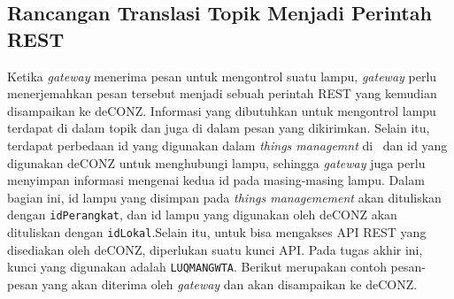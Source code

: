 \subsection{Rancangan Translasi Topik Menjadi Perintah REST}
Ketika \textit{gateway} menerima pesan untuk mengontrol suatu lampu, \textit{gateway} perlu menerjemahkan pesan tersebut menjadi sebuah perintah REST yang kemudian disampaikan ke deCONZ. Informasi yang dibutuhkan untuk mengontrol lampu terdapat di dalam topik dan juga di dalam pesan yang dikirimkan. Selain itu, terdapat perbedaan id yang digunakan dalam \textit{things managemnt} di \plat~dan id yang digunakan deCONZ untuk menghubungi lampu, sehingga \textit{gateway} juga perlu menyimpan informasi mengenai kedua id pada masing-masing lampu. Dalam bagian ini, id lampu yang disimpan pada \textit{things managemement} akan dituliskan dengan \texttt{idPerangkat}, dan id lampu yang digunakan oleh deCONZ akan dituliskan dengan \texttt{idLokal}.Selain itu, untuk bisa mengakses API REST yang disediakan oleh deCONZ, diperlukan suatu kunci API. Pada tugas akhir ini, kunci yang digunakan adalah \texttt{LUQMANGWTA}. Berikut merupakan contoh pesan-pesan yang akan diterima oleh \textit{gateway} dan akan disampaikan ke deCONZ.

